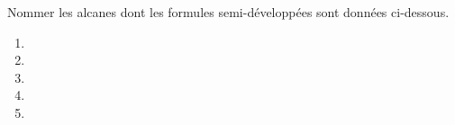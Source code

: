 Nommer les alcanes dont les formules semi-développées sont données ci-dessous.
\begin{enumerate}
    \item {}
    \item {}
    \item {}
    \item {}
    \item {}
\end{enumerate}
